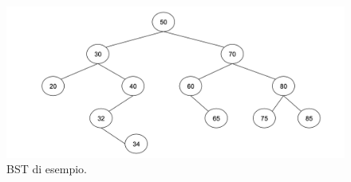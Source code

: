 \begin{figure}[h!] %
    \centering %
    \includegraphics[width=1\textwidth]{images/bst.png}
    \caption{BST di esempio.} %
    \label{fig:logo} %
\end{figure}

